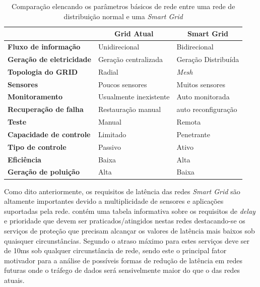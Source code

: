 \begin{table}[tbp]
\begin{tabular}{l|l|l|}
\cline{2-3}
 & \multicolumn{1}{c|}{\textbf{Grid Atual}} & \multicolumn{1}{c|}{\textbf{Smart Grid}} \\ \hline
\multicolumn{1}{|l|}{\textbf{Fluxo de informação}} & Unidirecional & Bidirecional \\ \hline
\multicolumn{1}{|l|}{\textbf{Geração de eletricidade}} & Geração centralizada & Geração Distribuída \\ \hline
\multicolumn{1}{|l|}{\textbf{Topologia do GRID}} & Radial & \emph{Mesh} \\ \hline
\multicolumn{1}{|l|}{\textbf{Sensores}} & Poucos sensores & Muitos sensores \\ \hline
\multicolumn{1}{|l|}{\textbf{Monitoramento}} & Usualmente inexistente & Auto monitorada \\ \hline
\multicolumn{1}{|l|}{\textbf{Recuperação de falha}} & Restauração manual & auto reconfiguração \\ \hline
\multicolumn{1}{|l|}{\textbf{Teste}} & Manual & Remota \\ \hline
\multicolumn{1}{|l|}{\textbf{Capacidade de controle}} & Limitado & Penetrante \\ \hline
\multicolumn{1}{|l|}{\textbf{Tipo de controle}} & Passivo & Ativo \\ \hline
\multicolumn{1}{|l|}{\textbf{Eficiência}} & Baixa & Alta \\ \hline
\multicolumn{1}{|l|}{\textbf{Geração de poluição}} & Alta & Baixa \\ \hline
\end{tabular}
\caption[Comparação entre GRIDS normal e \emph{Smart}]{Comparação elencando os parâmetros básicos de rede entre uma rede de distribuição normal e uma \emph{Smart Grid}}
\label{tab_comparacao_grids}
\end{table}

Como dito anteriormente, os requisitos de latência das redes \emph{Smart Grid} são altamente importantes devido a multiplicidade de sensores e aplicações suportadas pela rede. \cite{Art-Deshpande2011} contém uma tabela informativa sobre os requisitos de \emph{delay} e prioridade que devem ser praticados/atingidos nestas redes destacando-se os serviços de proteção que precisam alcançar os valores de latência mais baixos sob quaisquer circunstâncias. Segundo \cite{Art-Deshpande2011} o atraso máximo para estes serviços deve ser de 10ms sob qualquer circunstância de rede, sendo este o principal fator motivador para a análise de possíveis formas de redução de latência em redes futuras onde o tráfego de dados será sensivelmente maior do que o das redes atuais.

